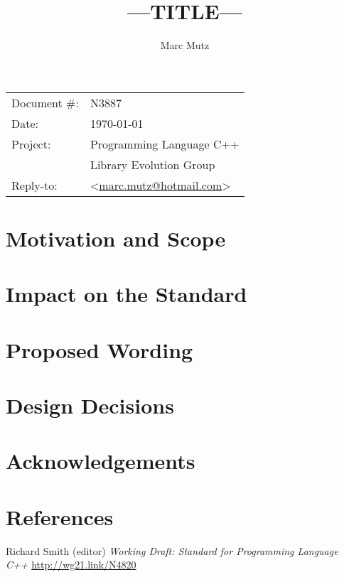 \documentclass[11pt]{article}
\date{}
\title{---TITLE---}
\makeatletter
\newcommand{\emailaddress}{marc.mutz@hotmail.com}
\newcommand{\email}{\href{mailto:\emailaddress}{\emailaddress}}
\makeatother
\begin{document}
\maketitle\vspace{-2cm}

\begin{tabular}{ll}
  Document \#:&N3887\\
  Date:       &\today\\
  Project:    &Programming Language C++\\
              &Library Evolution Group\\
  Reply-to:   &\author{Marc Mutz} \textless\email\textgreater
\end{tabular}
\vspace{1cm}
\begin{abstract}

\end{abstract}

\tableofcontents

\section{Motivation and Scope}

\section{Impact on the Standard}

\section{Proposed Wording}

\section{Design Decisions}

\section{Acknowledgements}

\section{References}
\renewcommand{\section}[2]{}%
\begin{thebibliography}{9}
  Richard Smith (editor)\newline
  \emph{Working Draft: Standard for Programming Language C++}\newline
  \url{http://wg21.link/N4820}
\end{thebibliography}
\end{document}
